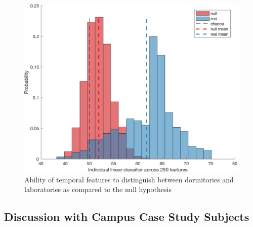 \begin{figure}[ht!]
\begin{center}
\includegraphics[width=0.7\columnwidth]{figures/Output_UnivDormVsLab_Dist/Output_UnivDormVsLab_Dist}
\caption{{Ability of temporal features to distinguish between dormitories and laboratories as compared to the null hypothesis
\label{sec:labsvsdorms_nullhypth}%
}}
\end{center}
\end{figure}

\subsection{Discussion with Campus Case Study Subjects}
\label{sec:buildinguseclassificationdiscussion}

